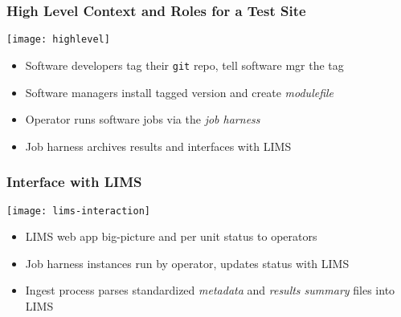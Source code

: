 \documentclass[xcolor=dvipsnames]{beamer}
\newcommand{\code}[1]{\texttt{#1}}
\begin{document}
\begin{frame}
  \frametitle{High Level Context and Roles for a Test Site}
  \texttt{[image: highlevel]}

  \begin{itemize}
  \item Software developers tag their \code{git} repo, tell software mgr the tag
  \item Software managers install tagged version and create \textit{modulefile}
  \item Operator runs software jobs via the \textit{job harness}
  \item Job harness archives results and interfaces with LIMS
  \end{itemize}

\end{frame}

\begin{frame}
  \frametitle{Interface with LIMS}
  \begin{center}
    \texttt{[image: lims-interaction]}    
  \end{center}
  \begin{itemize}
  \item LIMS web app big-picture and per unit status to operators
  \item Job harness instances run by operator, updates status with LIMS
  \item Ingest process parses standardized \textit{metadata} and
    \textit{results summary} files into LIMS
  \end{itemize}
\end{frame}
\end{document}
